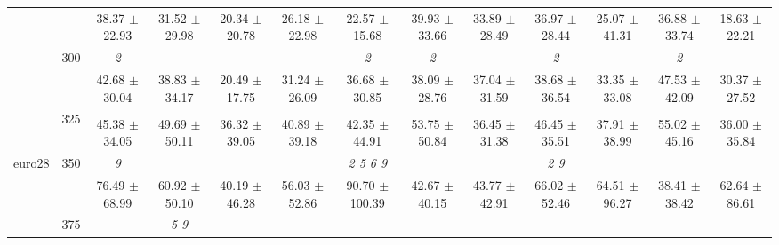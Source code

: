 \begin{table}[h]
{\begin{tabular}{
        ccccccccccccc}
 & & \cellcolor[HTML]{EFEFEF} 38.37 $\pm$ 22.93& \cellcolor[HTML]{EFEFEF} 31.52 $\pm$ 29.98& \cellcolor[HTML]{EFEFEF} 20.34 $\pm$ 20.78& \cellcolor[HTML]{EFEFEF} 26.18 $\pm$ 22.98& \cellcolor[HTML]{EFEFEF} 22.57 $\pm$ 15.68& \cellcolor[HTML]{EFEFEF} 39.93 $\pm$ 33.66& \cellcolor[HTML]{EFEFEF} 33.89 $\pm$ 28.49& \cellcolor[HTML]{EFEFEF} 36.97 $\pm$ 28.44& \cellcolor[HTML]{EFEFEF} 25.07 $\pm$ 41.31& \cellcolor[HTML]{EFEFEF} 36.88 $\pm$ 33.74& \cellcolor[HTML]{EFEFEF} 18.63 $\pm$ 22.21 \\ 
 & \multirow{2}{*}{300}& \textit{ 2 }& & & & \textit{ 2 }& \textit{ 2 }& & \textit{ 2 }& & \textit{ 2 }&  \\ 
 & & 42.68 $\pm$ 30.04& 38.83 $\pm$ 34.17& 20.49 $\pm$ 17.75& 31.24 $\pm$ 26.09& 36.68 $\pm$ 30.85& 38.09 $\pm$ 28.76& 37.04 $\pm$ 31.59& 38.68 $\pm$ 36.54& 33.35 $\pm$ 33.08& 47.53 $\pm$ 42.09& 30.37 $\pm$ 27.52 \\ 
 & \multirow{2}{*}{325}& \cellcolor[HTML]{EFEFEF} & \cellcolor[HTML]{EFEFEF} & \cellcolor[HTML]{EFEFEF} & \cellcolor[HTML]{EFEFEF} & \cellcolor[HTML]{EFEFEF} & \cellcolor[HTML]{EFEFEF} & \cellcolor[HTML]{EFEFEF} & \cellcolor[HTML]{EFEFEF} & \cellcolor[HTML]{EFEFEF} & \cellcolor[HTML]{EFEFEF} & \cellcolor[HTML]{EFEFEF}  \\ 
 & & \cellcolor[HTML]{EFEFEF} 45.38 $\pm$ 34.05& \cellcolor[HTML]{EFEFEF} 49.69 $\pm$ 50.11& \cellcolor[HTML]{EFEFEF} 36.32 $\pm$ 39.05& \cellcolor[HTML]{EFEFEF} 40.89 $\pm$ 39.18& \cellcolor[HTML]{EFEFEF} 42.35 $\pm$ 44.91& \cellcolor[HTML]{EFEFEF} 53.75 $\pm$ 50.84& \cellcolor[HTML]{EFEFEF} 36.45 $\pm$ 31.38& \cellcolor[HTML]{EFEFEF} 46.45 $\pm$ 35.51& \cellcolor[HTML]{EFEFEF} 37.91 $\pm$ 38.99& \cellcolor[HTML]{EFEFEF} 55.02 $\pm$ 45.16& \cellcolor[HTML]{EFEFEF} 36.00 $\pm$ 35.84 \\ 
 \multirow{4}{*}{euro28} & \multirow{2}{*}{350}& \textit{ 9 }& & & & \textit{ 2 5 6 9 }& & & \textit{ 2 9 }& & &  \\ 
 & & 76.49 $\pm$ 68.99& 60.92 $\pm$ 50.10& 40.19 $\pm$ 46.28& 56.03 $\pm$ 52.86& 90.70 $\pm$ 100.39& 42.67 $\pm$ 40.15& 43.77 $\pm$ 42.91& 66.02 $\pm$ 52.46& 64.51 $\pm$ 96.27& 38.41 $\pm$ 38.42& 62.64 $\pm$ 86.61 \\ 
 & \multirow{2}{*}{375}& \cellcolor[HTML]{EFEFEF} & \cellcolor[HTML]{EFEFEF} \textit{ 5 9 }& \cellcolor[HTML]{EFEFEF} & \cellcolor[HTML]{EFEFEF} & \cellcolor[HTML]{EFEFEF} & \cellcolor[HTML]{EFEFEF} & \cellcolor[HTML]{EFEFEF} & \cellcolor[HTML]{EFEFEF} & \cellcolor[HTML]{EFEFEF} & \cellcolor[HTML]{EFEFEF} & \cellcolor[HTML]{EFEFEF}  \\ 

\end{tabular}}
\end{table}
